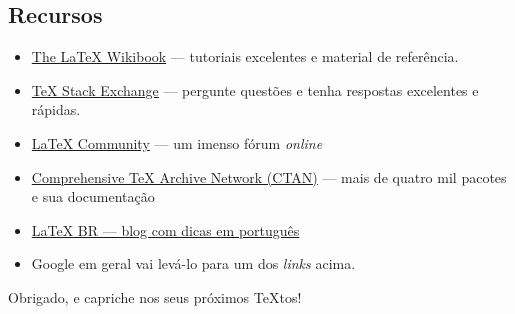 \documentclass{beamer}
\begin{document}
\subsection{Recursos}
\begin{frame}{\insertsubsection}
\begin{itemize}
\item \href{http://en.wikibooks.org/wiki/LaTeX}{The \LaTeX{} Wikibook} ---
tutoriais excelentes e material de referência.
\item \href{http://tex.stackexchange.com/}{\TeX{} Stack Exchange} --- pergunte questões e tenha respostas excelentes e rápidas.
\item \href{http://www.latex-community.org/}{\LaTeX{} Community} --- um imenso fórum \emph{online}
\item \href{http://ctan.org/}{Comprehensive \TeX{} Archive Network (CTAN)} ---
mais de quatro mil pacotes e sua documentação


\item \href{http://latexbr.blogspot.com.br/}{\LaTeX{} BR --- blog com dicas em português}
\item Google em geral vai levá-lo para um dos \emph{links} acima.
\end{itemize}
\end{frame}

\begin{frame}
\begin{center}
Obrigado, e capriche nos seus próximos  \TeX{}tos!
\end{center}
\end{frame}
\end{document}
